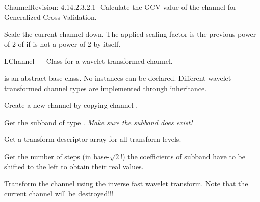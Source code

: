 \begin{manpage}{\libtitle}{Channel}{$ $Revision: 4.14.2.3.2.1 $ $}
    Calculate the GCV value of the channel for Generalized Cross Validation.



\subtitle{Virtual \\ Protected \\ Operations}

    Scale the current channel down. The applied scaling factor is the previous
    power of 2 of  if  is not a power of 2 by itself.


\separator

\subtitle{Name}
    LChannel --- Class for a wavelet transformed channel.


\subtitle{Declaration}
     is an abstract base class. No instances can be declared.
    Different wavelet transformed channel types are implemented through
    inheritance.

    Create a new channel by copying channel .


\subtitle{Public \\ Operations}

    Get the subband of type .
    \emph{Make sure the subband does exist!}

    Get a transform descriptor array for all transform levels.

    Get the number of steps (in base-$\sqrt{2}$!) the coefficients of subband
     have to be shifted to the left to obtain their real values.

    Transform the channel using the inverse fast wavelet transform. Note that
    the current channel will be destroyed!!!



\end{manpage}
